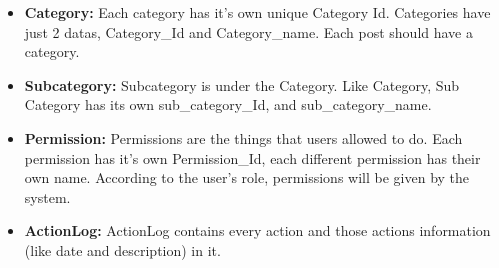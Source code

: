 \begin{itemize}
    \item \textbf{Category:} Each category has it's own unique Category Id. Categories have just 2 datas, Category\_Id and Category\_name. Each post should have a category.\newline
    \item \textbf{Subcategory:} Subcategory is under the Category. Like Category, Sub Category has its own sub\_category\_Id, and sub\_category\_name. \newline
    \item \textbf{Permission: }Permissions are the things that users allowed to do. Each permission has it's own Permission\_Id, each different permission has their own name. According to the user's role, permissions will be given by the system.\newline
    \item \textbf{ActionLog:} ActionLog contains every action and those actions information (like date and description) in it.
\end{itemize}

